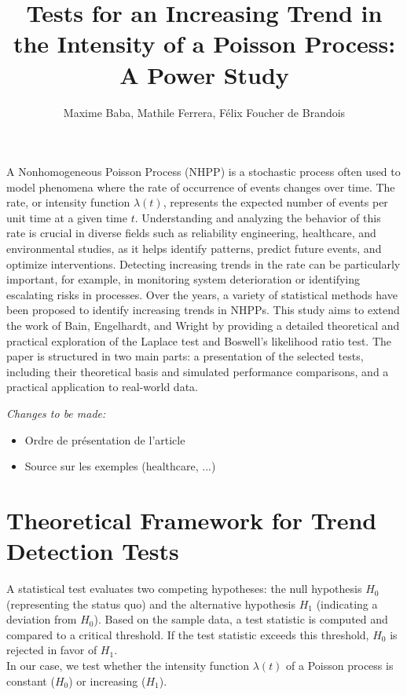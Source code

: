 \documentclass{journalstyle}
\title{Tests for an Increasing Trend in the Intensity of a Poisson Process: A Power Study}
\author{Maxime Baba, Mathile Ferrera, Félix Foucher de Brandois}
\begin{document}
\maketitle





A Nonhomogeneous Poisson Process (NHPP) is a stochastic process often used to model phenomena where the rate of occurrence of events changes over time.
The rate, or intensity function $\lambda(t)$, represents the expected number of events per unit time at a given time $t$.
Understanding and analyzing the behavior of this rate is crucial in diverse fields such as reliability engineering, healthcare, and environmental studies, as it helps identify patterns, predict future events, and optimize interventions.
Detecting increasing trends in the rate can be particularly important, for example, in monitoring system deterioration or identifying escalating risks in processes.
Over the years, a variety of statistical methods have been proposed to identify increasing trends in NHPPs.
This study aims to extend the work of Bain, Engelhardt, and Wright \cite{BainEngelhardtWright} by providing a detailed theoretical and practical exploration of the Laplace test and Boswell’s likelihood ratio test.
The paper is structured in two main parts: a presentation of the selected tests, including their theoretical basis and simulated performance comparisons, and a practical application to real-world data.

\textit{Changes to be made:}
\begin{itemize}
    \item Ordre de présentation de l'article
    \item Source sur les exemples (healthcare, ...)
\end{itemize}

\section{Theoretical Framework for Trend Detection Tests}

A statistical test evaluates two competing hypotheses: the null hypothesis $H_0$ (representing the status quo) and the alternative hypothesis $H_1$ (indicating a deviation from $H_0$).
Based on the sample data, a test statistic is computed and compared to a critical threshold.
If the test statistic exceeds this threshold, $H_0$ is rejected in favor of $H_1$. \\
In our case, we test whether the intensity function $\lambda(t)$ of a Poisson process is constant ($H_0$) or increasing ($H_1$).
\end{document}
